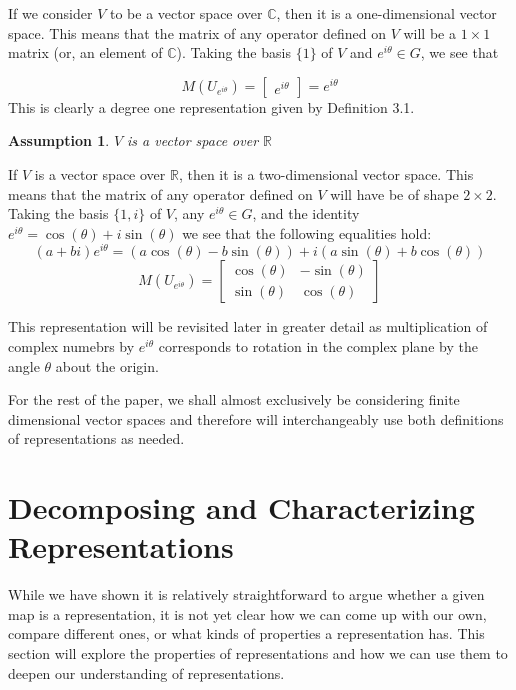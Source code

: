 \documentclass[10pt]{ucthesis}
\newtheorem{assumption}[definition]{Assumption}
\begin{document}
If we consider $V$ to be a vector space over $\mathbb{C}$, then it is a one-dimensional vector space. This means that the matrix of any operator defined on $V$ will be a $1\times 1$ matrix (or, an element of $\mathbb{C}$). Taking the basis $\{1\}$ of $V$ and $e^{i\theta} \in G$, we see that 

$$M(U_{e^{i\theta}}) = \begin{bmatrix}
					e^{i\theta}
				\end{bmatrix} = e^{i\theta} $$
This is clearly a degree one representation given by Definition 3.1.

\begin{assumption}
	$V$ is a vector space over $\mathbb{R}$
\end{assumption}

If $V$ is a vector space over $\mathbb{R}$, then it is a two-dimensional vector space. This means that the matrix of any operator defined on $V$ will have be of shape $2\times2$. Taking the basis $\{1,i\}$ of $V$, any $e^{i\theta} \in G$, and the identity $e^{i\theta} = \cos(\theta) + i\sin(\theta)$ we see that the following equalities hold:
$$(a+bi)e^{i\theta} = (a\cos(\theta)-b\sin(\theta))+i(a\sin(\theta)+b\cos(\theta))$$
$$M(U_{e^{i\theta}}) = \begin{bmatrix}
					\cos(\theta) & -\sin(\theta) \\
                                        \sin(\theta) & \cos(\theta)
				\end{bmatrix}$$

This representation will be revisited later in greater detail as multiplication of complex numebrs by $e^{i\theta}$ corresponds to rotation in the complex plane by the angle $\theta$ about the origin.

For the rest of the paper, we shall almost exclusively be considering finite dimensional vector spaces and therefore will interchangeably use both definitions of representations as needed.

\section{Decomposing and Characterizing Representations}

While we have shown it is relatively straightforward to argue whether a given map is a representation, it is not yet clear how we can come up with our own, compare different ones, or what kinds of properties a representation has. This section will explore the properties of representations and how we can use them to deepen our understanding of representations.
\end{document}
